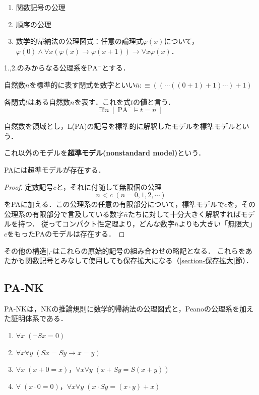 \documentclass[uplatex, dvipdfmx]{jsreport}
\begin{document}
\begin{definition}[PAの公理]\mbox{}
    \begin{enumerate}
        \item 関数記号の公理
        \item 順序の公理
        \item 数学的帰納法の公理図式：任意の論理式$\varphi(x)$について，$\varphi(0)\land\forall x(\varphi(x)\to\varphi(x+1))\to\forall x\varphi(x)$．
    \end{enumerate}
    1.,2.のみからなる公理系を$\mathrm{PA}^-$とする．
\end{definition}
\begin{definition}[numeral]
    自然数$n$を標準的に表す閉式を数字といい$\overline{n}:\equiv((\cdots((0+1)+1)\cdots)+1)$
\end{definition}

\begin{proposition}[value]
    各閉式$t$はある自然数$n$を表す．これを式$t$の\textbf{値}と言う．
    \[\exists! n\;[\;\mathrm{PA}^-\vDash t=\overline{n}\;]\]
\end{proposition}

\begin{definition}
    自然数を領域とし，L(PA)の記号を標準的に解釈したモデルを標準モデルという．

    これ以外のモデルを\textbf{超準モデル(nonstandard model)}という．
\end{definition}
\begin{proposition}
    PAには超準モデルが存在する．
\end{proposition}
\begin{proof}
    定数記号$c$と，それに付随して無限個の公理
    \[\overline{n}<c\;(n=0,1,2,\cdots)\]
    をPAに加える．この公理系の任意の有限部分について，標準モデルで$c$を，その公理系の有限部分で言及している数字$\overline{n}$たちに対して十分大きく解釈すればモデルを持つ．
    従ってコンパクト性定理より，どんな数字$\overline{n}$よりも大きい「無限大」$c$をもったPAのモデルは存在する．
\end{proof}

その他の構造|,-はこれらの原始的記号の組み合わせの略記となる．
これらをあたかも関数記号とみなして使用しても保存拡大になる（\ref{section-保存拡大}節）．

\subsection{PA-NK}

\begin{definition}[Peanoの公理]
    PA-NKは，NKの推論規則に数学的帰納法の公理図式と，Peanoの公理系を加えた証明体系である．
    \begin{enumerate}
        \item $\forall x\;(\lnot Sx=0)$
        \item $\forall x\forall y\;(Sx=Sy\to x=y)$
        \item $\forall x\;(x+0=x)$，$\forall x\forall y\;(x+Sy=S(x+y))$
        \item $\forall\;(x\cdot 0=0)$，$\forall x\forall y\;(x\cdot Sy=(x\cdot y)+x)$
    \end{enumerate}
\end{definition}
\end{document}
